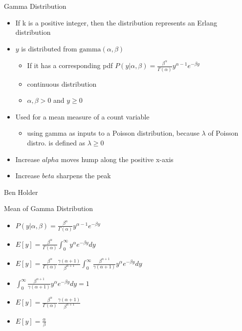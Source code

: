 \documentclass{beamer}
\begin{document}
\begin{frame}{Gamma Distribution}
    \begin{center}
    \begin{itemize}
        \item If k is a positive integer, then the distribution represents an Erlang distribution
        \item $y$ is distributed from $\mathrm{gamma}(\alpha, \beta)$
        \begin{itemize}
            \item If it has a corresponding pdf $P(y|\alpha, \beta) = \frac{\beta^{\alpha}}{\Gamma(\alpha)} y^{\alpha-1} e^{-\beta y}$
            \item continuous distribution
            \item $\alpha, \beta >0$ and $y \geq 0$ 
        \end{itemize}
        \item Used for a mean measure of a count variable
        \begin{itemize}
            \item using gamma as inputs to a Poisson distribution, because $\lambda$ of Poisson distro. is defined as $\lambda \geq 0$
        \end{itemize}
        \item Increase $alpha$ moves hump along the positive x-axis
        \item Increase $beta$ sharpens the peak
    \end{itemize}
        Ben Holder
        
    \end{center}
\end{frame}

\begin{frame}{Mean of Gamma Distribution}
    \begin{center}
    \begin{itemize}
        \item $P(y|\alpha, \beta) = \frac{\beta^{\alpha}}{\Gamma(\alpha)} y^{\alpha-1} e^{-\beta y}$
        \item $E[y] = \frac{\beta^{\alpha}}{\Gamma(\alpha)} \int^{\infty}_0 y^{\alpha} e^{-\beta y} dy$
        \item $E[y] = \frac{\beta^{\alpha}}{\Gamma(\alpha)} \frac{\gamma(\alpha+1)}{\beta^{\alpha+1}} \int^{\infty}_0 \frac{\beta^{\alpha+1}}{\gamma(\alpha+1)} y^{\alpha} e^{-\beta y} dy$
        \item $\int^{\infty}_0 \frac{\beta^{\alpha+1}}{\gamma(\alpha+1)} y^{\alpha} e^{-\beta y} dy = 1$
        \item $E[y] = \frac{\beta^{\alpha}}{\Gamma(\alpha)} \frac{\gamma(\alpha+1)}{\beta^{\alpha+1}}$
        \item $E[y] = \frac{\alpha}{\beta}$
    \end{itemize}
        
    \end{center}
\end{frame}
\end{document}
